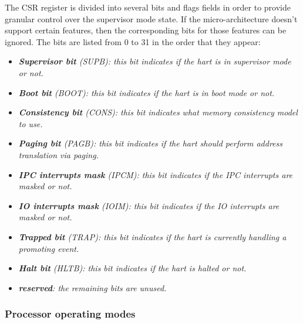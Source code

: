 \documentclass{article}
\begin{document}
                \vspace{10pt}

                The CSR register is divided into several bits and flags fields in order to provide granular control over the supervisor mode state. If the micro-architecture doesn't support certain features, then the corresponding bits for those features can be ignored. The bits are listed from 0 to 31 in the order that they appear:

                \begin{itemize}

                    \item \textit{\textbf{Supervisor bit} (SUPB): this bit indicates if the hart is in supervisor mode or not.}

                    \item \textit{\textbf{Boot bit} (BOOT): this bit indicates if the hart is in boot mode or not.}
                    \item \textit{\textbf{Consistency bit} (CONS): this bit indicates what memory consistency model to use.}
                    \item \textit{\textbf{Paging bit} (PAGB): this bit indicates if the hart should perform address translation via paging.}

                    \item \textit{\textbf{IPC interrupts mask} (IPCM): this bit indicates if the IPC interrupts are masked or not.}
                    \item \textit{\textbf{IO interrupts mask} (IOIM): this bit indicates if the IO interrupts are masked or not.}

                    \item \textit{\textbf{Trapped bit} (TRAP): this bit indicates if the hart is currently handling a promoting event.}

                    \item \textit{\textbf{Halt bit} (HLTB): this bit indicates if the hart is halted or not.}
                    \item \textit{\textbf{reserved}: the remaining bits are unused.}

                \end{itemize}

            \subsubsection{Processor operating modes}
\end{document}

